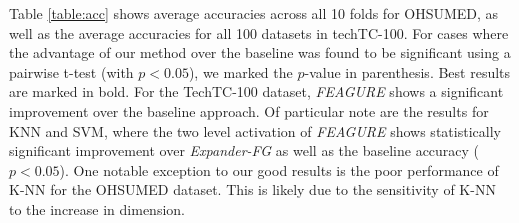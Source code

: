 \documentclass{article}
\theoremstyle{definition}
\begin{document}
Table \ref{table:acc} shows average accuracies across all 10 folds for OHSUMED, as well as the average accuracies for all 100 datasets in techTC-100. For cases where the advantage of our method over the baseline was found to be significant using a pairwise t-test (with $p<0.05$), we marked the $p$-value in parenthesis. Best results are marked in bold.
For the TechTC-100 dataset, \emph{FEAGURE} shows a significant improvement over the baseline approach. %
Of particular note are the results for KNN and SVM, where the two level activation of \emph{FEAGURE} shows statistically significant improvement over \emph{Expander-FG} as well as the baseline accuracy ($p < 0.05$). 
One notable exception to our good results is the poor performance of K-NN for the OHSUMED dataset. This is likely due to the sensitivity of K-NN to the increase in dimension. 

\end{document}
